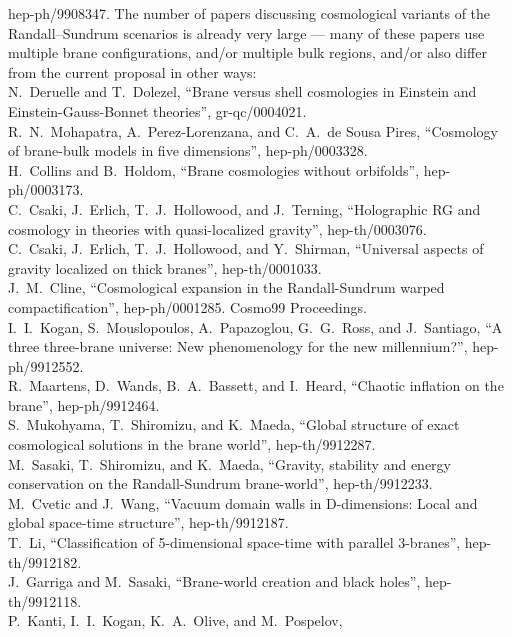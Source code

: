 \documentclass[a4paper,12pt]{article}
\begin{document}
\begin{thebibliography}{99}
hep-ph/9908347.
The number of papers discussing cosmological variants of the
Randall--Sundrum scenarios is already very large --- many of these
papers use multiple brane configurations, and/or multiple bulk
regions, and/or also differ from the current proposal in other ways:
\\
N.~Deruelle and T.~Dolezel,
``Brane versus shell cosmologies in Einstein and Einstein-Gauss-Bonnet theories'',
gr-qc/0004021.
\\
R.~N.~Mohapatra, A.~Perez-Lorenzana, and C.~A.~de Sousa Pires,
``Cosmology of brane-bulk models in five dimensions'',
hep-ph/0003328.
\\
H.~Collins and B.~Holdom,
``Brane cosmologies without orbifolds'',
hep-ph/0003173.
\\
C.~Csaki, J.~Erlich, T.~J.~Hollowood, and J.~Terning,
``Holographic RG and cosmology in theories with quasi-localized gravity'',
hep-th/0003076.
\\
C.~Csaki, J.~Erlich, T.~J.~Hollowood, and Y.~Shirman,
``Universal aspects of gravity localized on thick branes'',
hep-th/0001033.
\\
J.~M.~Cline,
``Cosmological expansion in the Randall-Sundrum warped compactification'',
hep-ph/0001285.
Cosmo99 Proceedings.
\\
I.~I.~Kogan, S.~Mouslopoulos, A.~Papazoglou, G.~G.~Ross, and J.~Santiago,
``A three three-brane universe: New phenomenology for the new millennium?'',
hep-ph/9912552.
\\
R.~Maartens, D.~Wands, B.~A.~Bassett, and I.~Heard,
``Chaotic inflation on the brane'',
hep-ph/9912464.
\\
S.~Mukohyama, T.~Shiromizu, and K.~Maeda,
``Global structure of exact cosmological solutions in the brane world'',
hep-th/9912287.
\\
M.~Sasaki, T.~Shiromizu, and K.~Maeda,
``Gravity, stability and energy conservation on the Randall-Sundrum  brane-world'',
hep-th/9912233.
\\
M.~Cvetic and J.~Wang,
``Vacuum domain walls in D-dimensions: Local and global space-time  structure'',
hep-th/9912187.
\\
T.~Li,
``Classification of 5-dimensional space-time with parallel 3-branes'',
hep-th/9912182.
\\
J.~Garriga and M.~Sasaki,
``Brane-world creation and black holes'',
hep-th/9912118.
\\
P.~Kanti, I.~I.~Kogan, K.~A.~Olive, and M.~Pospelov,

\end{thebibliography}
\end{document}
